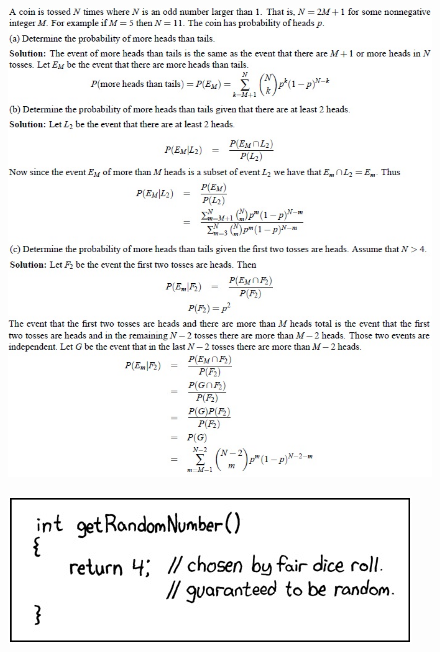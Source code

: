 \documentclass[11pt,landscape]{article}
\begin{document}
\begin{multicols}{3}
\begin{figure}[H]
    \includegraphics[scale=0.46]{./Images/1/Cointoss.jpg}
\end{figure}
\begin{figure}[H]
    \includegraphics[scale=0.8]{./Images/1/RandNumXKCD.jpg}
\end{figure}
\end{multicols}
\end{document}
